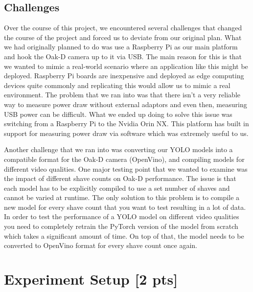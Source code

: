 \documentclass[sigconf,authorversion,nonacm]{acmart}
\begin{document}
\subsection{Challenges}

Over the course of this project, we encountered several challenges that changed the course of the project and forced us to deviate from our original plan. What we had originally planned to do was use a Raspberry Pi as our main platform and hook the Oak-D camera up to it via USB. The main reason for this is that we wanted to mimic a real-world scenario where an application like this might be deployed. Raspberry Pi boards are inexpensive and deployed as edge computing devices quite commonly and replicating this would allow us to mimic a real environment. The problem that we ran into was that there isn’t a very reliable way to measure power draw without external adaptors and even then, measuring USB power can be difficult. What we ended up doing to solve this issue was switching from a Raspberry Pi to the Nvidia Orin NX. This platform has built in support for measuring power draw via software which was extremely useful to us. 

Another challenge that we ran into was converting our YOLO models into a compatible format for the Oak-D camera (OpenVino), and compiling models for different video qualities. One major testing point that we wanted to examine was the impact of different shave counts on Oak-D performance. The issue is that each model has to be explicitly compiled to use a set number of shaves and cannot be varied at runtime. The only solution to this problem is to compile a new model for every shave count that you want to test resulting in a lot of data. In order to test the performance of a YOLO model on different video qualities you need to completely retrain the PyTorch version of the model from scratch which takes a significant amount of time. On top of that, the model needs to be converted to OpenVino format for every shave count once again.




\section{Experiment Setup  {\small {[2 pts]}}}
\end{document}
